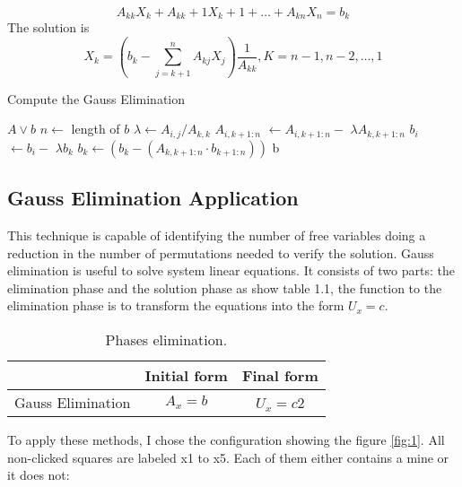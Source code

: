 \documentclass[a4paper]{article}
\numberwithin{equation}{subsection}
\begin{document}
\vspace{5mm} %
\begin{equation} \tag{1.3}
    A_{kk}X_k+A_{kk}+1X_k+1+\dots+A_{kn}X_n=b_k
\end{equation}
The solution is
\begin{equation} \tag{1.4}
    X_k=\left ( b_k-\sum_{j=k+1}^{n} A_{kj}X_j \right  )\frac{1}{A_{kk}}, K=n-1,n-2,\dots,1
\end{equation}
\begin{algorithm}[H]
\caption{Compute the Gauss Elimination}
\begin{algorithmic}
\REQUIRE $A \vee  b$ 
\STATE $n \leftarrow$ length of $b$
\STATE  $\lambda \leftarrow A_{i,j}/A_{k,k}$
\STATE $A_{i,k+1:n}$  $ \leftarrow A_{i,k+1:n}-$  $\lambda A_{k,k+1:n}$
\STATE $b_i$  $ \leftarrow b_i -$  $ \lambda b_k$
\ENDIF
\ENDFOR
\ENDFOR
{}
\STATE $b_k \leftarrow (b_k - (A_{k,k+1:n} \cdot b_{k+1:n}))$
\ENDFOR
\RETURN b 
\end{algorithmic}
\end{algorithm}

\subsection{Gauss Elimination Application}
This technique is capable of identifying the number of free variables doing a reduction in the number of permutations needed to verify the solution.  Gauss elimination is useful to solve system linear equations. It consists of two parts:  the elimination phase and the solution phase as show table 1.1, the function to the elimination phase is to transform the equations into the form $U_x = c$. 
\begin{table}[ht]
\centering
\caption{Phases elimination.}
\begin{tabular}[t]{lcc}
\hline
&Initial form &Final form \\
\hline
Gauss Elimination&$A_x=b$&$U_x=c$2\\
\hline
\end{tabular}
\end{table}%
\vspace{5mm} %
To apply these methods, I chose the configuration showing the figure \ref{fig:1}.  All non-clicked squares are labeled x1 to x5. Each of them either contains a mine or it does not:
\vspace{5mm} %
\end{document}
